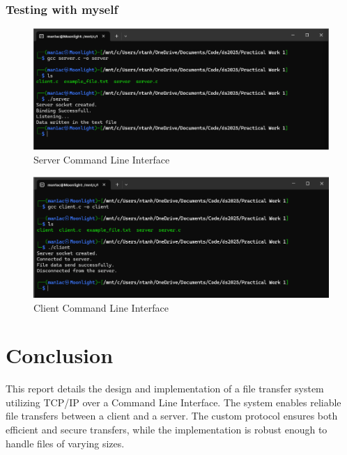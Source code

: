 \documentclass[a4paper,12pt]{article}
\begin{document}
\subsubsection{Testing with myself}
\begin{figure}[h]
    \centering
    \includegraphics[width=1\textwidth]{3.png}
    \caption{Server Command Line Interface}
    \label{fig:server_command_line_interface}
\end{figure}

\begin{figure}[h]  
    \centering
    \includegraphics[width=1\textwidth]{4.png}
    \caption{Client Command Line Interface}
    \label{fig:client_command_line_interface}
\end{figure}

\section{Conclusion}
This report details the design and implementation of a file transfer system utilizing TCP/IP over a Command Line Interface. The system enables reliable file transfers between a client and a server. The custom protocol ensures both efficient and secure transfers, while the implementation is robust enough to handle files of varying sizes.
\end{document}
